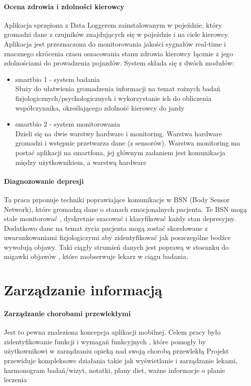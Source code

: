 \paragraph{Ocena zdrowia i zdolności kierowcy \cite{6583819}\\}
Aplikacja sprzężona z Data Loggerem zainstalowanym w pojeździe, który gromadzi dane z czujników znajdujących się w pojeździe i na ciele kierowcy. Aplikacja jest przeznaczona do monitorowania jakości sygnałów real-time i znacznego skrócenia czasu oszacowania stanu zdrowia kierowcy łącznie z jego zdolnościami do prowadzenia pojazdów. System składa się z dwóch modułów:
\begin{itemize}
\item smartbio 1 - system badania\\
Służy do ułatwienia gromadzenia informacji na temat rożnych badań fizjologicznych/psychologicznych i wykorzystanie ich do obliczenia współczynnika, określającego zdolność kierowcy do jazdy

\item smartbio 2 - system monitorowania\\
Dzieli się na dwie warstwy hardware i monitoring. Warstwa hardware gromadzi i wstępnie przetwarza dane (z sensorów). Warstwa monitoring ma postać aplikacji na smartfona, jej głównym zadaniem jest komunikacja między użytkownikiem, a warstwą hardware
\end{itemize}
\paragraph{Diagnozowanie depresji\\}
 Ta praca prponuje techniki poprawiające komunikacje w BSN (Body Sensor Network), które gromadzą dane o stanach emocjonalnych pacjenta. 
 Te BSN  mogą stale monitorować , dyskretnie szacować i klasyfikować każdy stan depresyjny. Dodatkowo dane na temat życia pacjenta mogą zostać skorelowane z 
 uwarunkowaniami fizjologiczymi aby zidentyfikować jak poszczególne bodźce wywołują objawy. Taki ciągły strumień danych jest poprawą w stosunku do 
 migawki objawów , które zaobserwuje lekarz w ciągu badania. 
 
 
\section{Zarządzanie informacją}
\paragraph{Zarządzanie chorobami przewlekłymi\\}
Jest to pewna znaleziona koncepcja aplikacji mobilnej. Celem pracy było zidentyfikowanie funkcji i wymagań funkcyjnych , które pomogły by użytkownikowi w zarządzaniu opieką nad swoją chorobą przewlekłą
 Projekt przewiduje kompleksowe działania takie jak wyświetlanie i zarządzanie lekami, harmonogram badań/wizyt, notatki, plany diet, ważne informacje o planie leczenia

